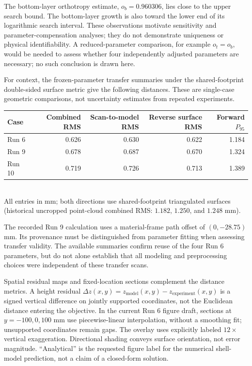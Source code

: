 \documentclass[11pt]{article}
\begin{document}
The bottom-layer orthotropy estimate, $o_b=0.960306$, lies close to the upper search bound. The bottom-layer growth is also toward the lower end of its logarithmic search interval. These observations motivate sensitivity and parameter-compensation analyses; they do not demonstrate uniqueness or physical identifiability. A reduced-parameter comparison, for example $o_t=o_b$, would be needed to assess whether four independently adjusted parameters are necessary; no such conclusion is drawn here.

For context, the frozen-parameter transfer summaries under the shared-footprint double-sided surface metric give the following distances. These are single-case geometric comparisons, not uncertainty estimates from repeated experiments.
\begin{center}
\begin{tabular}{lrrrr}\toprule
Case & Combined RMS & Scan-to-model RMS & Reverse surface RMS & Forward $P_{95}$ \\\midrule
Run 6 & 0.626 & 0.630 & 0.622 & 1.184 \\
Run 9 & 0.678 & 0.687 & 0.670 & 1.324 \\
Run 10 & 0.719 & 0.726 & 0.713 & 1.389 \\\bottomrule
\end{tabular}\\[3pt]
\small All entries in mm; both directions use shared-footprint triangulated surfaces (historical uncropped point-cloud combined RMS: $1.182$, $1.250$, and $1.248$ mm).
\end{center}
The recorded Run 9 calculation uses a material-frame path offset of $(0,-28.75)$ mm. Its provenance must be distinguished from parameter fitting when assessing transfer validity. The available summaries confirm reuse of the four Run 6 parameters, but do not alone establish that all modeling and preprocessing choices were independent of these transfer scans.

Spatial residual maps and fixed-location sections complement the distance metrics. A height residual $\Delta z(x,y)=z_{\mathrm{model}}(x,y)-z_{\mathrm{experiment}}(x,y)$ is a signed vertical difference on jointly supported coordinates, not the Euclidean distance entering the objective. In the current Run 6 figure draft, sections at $y=-100,0,100$ mm use piecewise-linear interpolation, without a smoothing fit; unsupported coordinates remain gaps. The overlay uses explicitly labeled $12\times$ vertical exaggeration. Directional shading conveys surface orientation, not error magnitude. ``Analytical'' is the requested figure label for the numerical shell-model prediction, not a claim of a closed-form solution.
\end{document}
